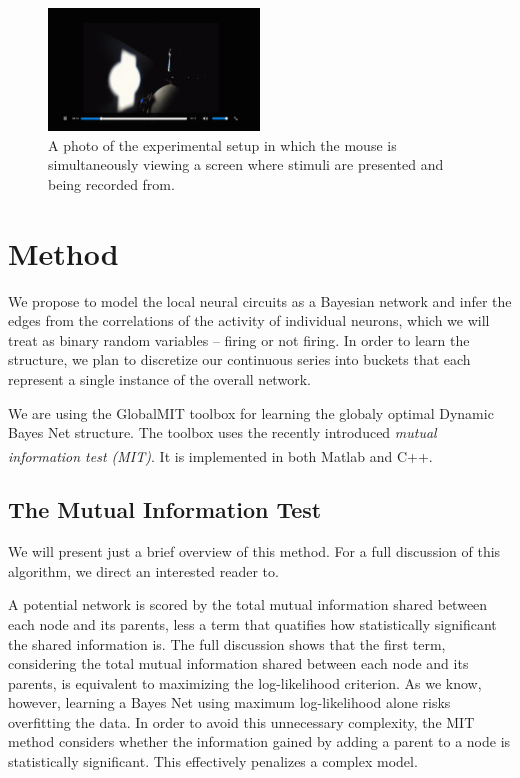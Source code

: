 \documentclass{article}
\begin{document}
\begin{figure}[h]
  \centering
  \includegraphics[width=0.5\textwidth]{looming}
  \caption{A photo of the experimental setup in which the mouse is simultaneously viewing a screen where stimuli are presented and being recorded from.}
  \label{setup}
\end{figure}

\section*{Method}

We propose to model the local neural circuits as a Bayesian network and infer 
the edges from the correlations of the activity of individual neurons, which 
we will treat as binary random variables – firing or not firing. In order to 
learn the structure, we plan to discretize our continuous series into buckets 
that each represent a single instance of the overall network. \par

We are using the GlobalMIT toolbox for learning the globaly optimal Dynamic 
Bayes Net structure.\cite{globalmit} The toolbox uses the recently introduced 
\emph{mutual information test (MIT)}. It is implemented in both 
Matlab\textsuperscript{\textregistered} and C++. \par

\subsection*{The Mutual Information Test}

We will present just a brief overview of this method. For a full discussion of 
this algorithm, we direct an interested reader to.\cite{vinh11} \par

A potential network is scored by the total mutual information shared between 
each node and its parents, less a term that quatifies how statistically 
significant the shared information is. The full discussion shows that the 
first term, considering the total mutual information shared between each node 
and its parents, is equivalent to maximizing the log-likelihood criterion. 
As we know, however, learning a Bayes Net using maximum log-likelihood alone 
risks overfitting the data. In order to avoid this unnecessary complexity, the 
MIT method considers whether the information gained by adding a parent to a 
node is statistically significant. This effectively penalizes a complex 
model. \par
\end{document}
